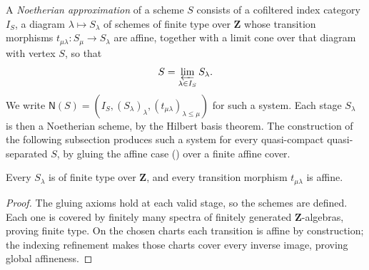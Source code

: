 \begin{definition}
  \label{def:nagata-noetherian-inverse-system}
  \leanok

  A \emph{Noetherian approximation} of a scheme $S$ consists of a cofiltered
  index category $I_S$, a diagram $\lambda\mapsto S_\lambda$ of schemes of
  finite type over $\mathbf Z$ whose transition morphisms
  $t_{\mu\lambda}\colon S_\mu\to S_\lambda$ are affine, together with a limit
  cone over that diagram with vertex $S$, so that
  \[
    S=\varprojlim_{\lambda\in I_S}S_\lambda .
  \]
  We write $\mathsf N(S)=(I_S,(S_\lambda)_\lambda,
  (t_{\mu\lambda})_{\lambda\leq\mu})$ for such a system.  Each stage
  $S_\lambda$ is then a Noetherian scheme, by the Hilbert basis theorem.  The
  construction of the following subsection produces such a system for every
  quasi-compact quasi-separated $S$, by gluing the affine case
  () over a finite affine
  cover.
\end{definition}

\begin{lemma}
  \label{lemma:nagata-glue-noetherian-stage}

  Every $S_\lambda$ is of finite type over $\mathbf Z$, and every transition
  morphism $t_{\mu\lambda}$ is affine.
\end{lemma}

\begin{proof}
  The gluing axioms hold at each valid stage, so the schemes are defined.
  Each one is covered by finitely many spectra of finitely generated
  $\mathbf Z$-algebras, proving finite type.  On the chosen charts each
  transition is affine by construction; the indexing refinement makes those
  charts cover every inverse image, proving global affineness.
\end{proof}

